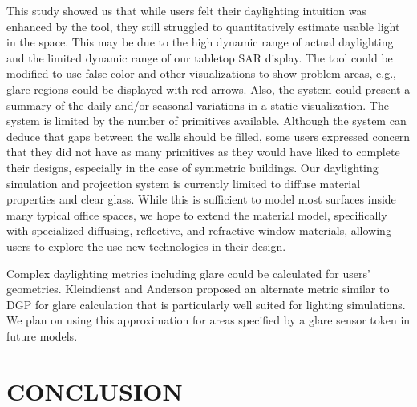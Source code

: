 \documentclass[preprint]{elsarticle}
\begin{document}
This study showed us that while users felt their daylighting intuition
was enhanced by the tool, they still struggled to quantitatively
estimate usable light in the space.  This may be due to the high
dynamic range of actual daylighting and the limited dynamic range of
our tabletop SAR display.  The tool could be modified to use false
color and other visualizations to show problem areas, e.g., glare
regions could be displayed with red arrows.  Also, the system could
present a summary of the daily and/or seasonal variations in a static
visualization.  The system is limited by the number of primitives
available.  Although the system can deduce that gaps between the walls
should be filled, some users expressed concern that they did not have
as many primitives as they would have liked to complete their designs,
especially in the case of symmetric buildings.
%
Our daylighting simulation and projection system is currently limited
to diffuse material properties and clear glass.  While this is
sufficient to model most surfaces inside many typical office spaces,
we hope to extend the material model, specifically with specialized
diffusing, reflective, and refractive window materials, allowing users
to explore the use new technologies in their design.

Complex daylighting metrics including glare could be calculated for users'
geometries.  Kleindienst and Anderson \cite{klein} proposed an alternate 
metric similar to DGP for glare calculation that is particularly well suited
for lighting simulations.  We plan on using this approximation for areas specified
by a glare sensor token in future models.



\section{CONCLUSION}
\end{document}

